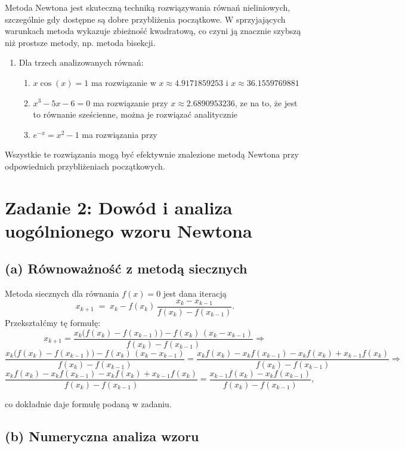 \documentclass[a4paper,12pt]{article}
\begin{document}
Metoda Newtona jest skuteczną techniką rozwiązywania równań nieliniowych, szczególnie gdy dostępne są dobre przybliżenia początkowe. W sprzyjających warunkach metoda wykazuje zbieżność kwadratową, co czyni ją znacznie szybszą niż prostsze metody, np. metoda bisekcji.

\begin{enumerate}
\item Dla trzech analizowanych równań:
\begin{enumerate}
    \item $x \cos(x) = 1$ ma rozwiązanie w $x \approx 4.9171859253$ i  $x \approx 36.1559769881$ 
    \item $x^3 - 5x - 6 = 0$ ma rozwiązanie przy $x \approx 2.6890953236 $, ze na to, że jest to równanie sześcienne, można je rozwiązać analitycznie \cite{wiki:Cubic_equation} 
    \item $e^{-x} = x^2 - 1$ ma rozwiązania przy 
\end{enumerate}
\end{enumerate}

Wszystkie te rozwiązania mogą być efektywnie znalezione metodą Newtona przy odpowiednich przybliżeniach początkowych.

\section*{Zadanie 2: Dowód i analiza uogólnionego wzoru Newtona}

\subsection*{(a) Równoważność z metodą siecznych}

Metoda siecznych dla równania \(f(x)=0\) jest dana iteracją
\[
x_{k+1}
\;=\;
x_k - f(x_k)\,\frac{x_k - x_{k-1}}{f(x_k)-f(x_{k-1})}.
\]
Przekształćmy tę formułę:
\[
x_{k+1}
=
\frac{x_k\bigl(f(x_k)-f(x_{k-1})\bigr)
      -f(x_k)\,(x_k-x_{k-1})}
     {f(x_k)-f(x_{k-1})} \Rightarrow
\]
\[
\frac{x_k\bigl(f(x_k)-f(x_{k-1})\bigr)
      -f(x_k)\,(x_k-x_{k-1})}
     {f(x_k)-f(x_{k-1})}
=
\frac{x_kf(x_k)-x_kf(x_{k-1})-x_kf(x_k)+x_{k-1}f(x_k)}
     {f(x_k)-f(x_{k-1})} \Rightarrow
\]
\[
\frac{x_kf(x_k)-x_kf(x_{k-1})-x_kf(x_k)+x_{k-1}f(x_k)}
     {f(x_k)-f(x_{k-1})}
=
\frac{x_{k-1}f(x_k)-x_kf(x_{k-1})}{f(x_k)-f(x_{k-1})},
\]

co dokładnie daje formułę podaną w zadaniu.

\subsection*{(b) Numeryczna analiza wzoru}
\end{document}
